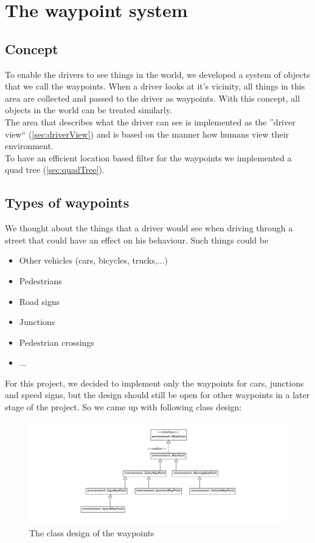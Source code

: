 \section{The waypoint system}
\label{sec:wayPointSystem}

\subsection{Concept}

To enable the drivers to see things in the world, we developed a system of 
objects that we call the waypoints. When a driver looks at it's vicinity, all
things in this area are collected and passed to the driver as waypoints. With
this concept, all objects in the world can be treated similarly.\\

\noindent The area that describes what the driver can see is implemented as the 
''driver view`` (\ref{sec:driverView}) and is based on the manner 
how humans view their environment. \\

\noindent To have an efficient location based filter for the waypoints we implemented a quad tree 
(\ref{sec:quadTree}).

\subsection{Types of waypoints}

We thought about the things that a driver would see when driving through a 
street that could have an effect on his behaviour. Such things could be

\begin{itemize}
\item Other vehicles (cars, bicycles, trucks,...)
\item Pedestrians
\item Road signs
\item Junctions
\item Pedestrian crossings
\item ...
\end{itemize}

For this project, we decided to implement only the waypoints for 
cars, junctions and speed signs, but the design should still be open for 
other waypoints in a later stage of the project. So we came up with following
class design:

\begin{figure}[htb]
\includegraphics[width=\textwidth]{images/waypoints.png}
\caption{The class design of the waypoints}
\label{fig:waypoints}
\end{figure}

